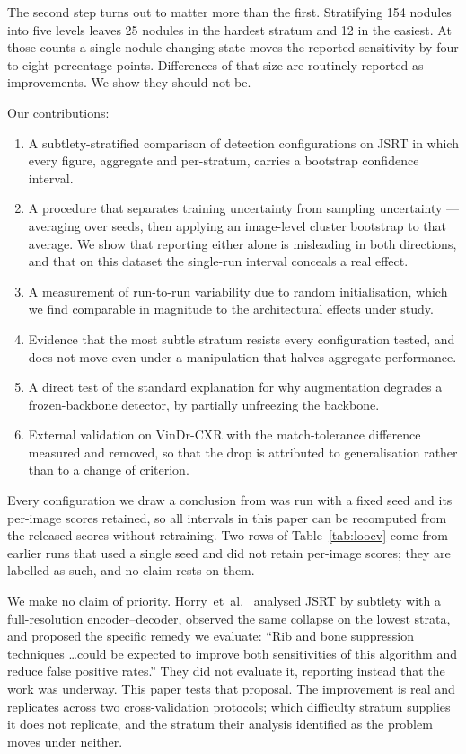 \documentclass[11pt,a4paper]{article}
\begin{document}
The second step turns out to matter more than the first. Stratifying 154
nodules into five levels leaves 25 nodules in the hardest stratum and 12 in the
easiest. At those counts a single nodule changing state moves the reported
sensitivity by four to eight percentage points. Differences of that size are
routinely reported as improvements. We show they should not be.

Our contributions:

\begin{enumerate}
  \item A subtlety-stratified comparison of detection configurations on JSRT in
        which every figure, aggregate and per-stratum, carries a bootstrap
        confidence interval.
  \item A procedure that separates training uncertainty from sampling
        uncertainty --- averaging over seeds, then applying an image-level
        cluster bootstrap to that average. We show that reporting either alone
        is misleading in both directions, and that on this dataset the
        single-run interval conceals a real effect.
  \item A measurement of run-to-run variability due to random initialisation,
        which we find comparable in magnitude to the architectural effects
        under study.
  \item Evidence that the most subtle stratum resists every configuration
        tested, and does not move even under a manipulation that halves
        aggregate performance.
  \item A direct test of the standard explanation for why augmentation degrades
        a frozen-backbone detector, by partially unfreezing the backbone.
  \item External validation on VinDr-CXR with the match-tolerance difference
        measured and removed, so that the drop is attributed to generalisation
        rather than to a change of criterion.
\end{enumerate}

Every configuration we draw a conclusion from was run with a fixed seed and
its per-image scores retained, so all intervals in this paper can be recomputed
from the released scores without retraining. Two rows of Table~\ref{tab:loocv} come from earlier runs that used a single
seed and did not retain per-image scores; they are labelled as such, and no claim
rests on them.

We make no claim of priority. Horry~et~al.~\cite{horry2023fullres} analysed
JSRT by subtlety with a full-resolution encoder--decoder, observed the same
collapse on the lowest strata, and proposed the specific remedy we evaluate:
``Rib and bone suppression techniques \ldots could be expected to improve both
sensitivities of this algorithm and reduce false positive rates.'' They did not
evaluate it, reporting instead that the work was underway. This paper tests that
proposal. The improvement is real and replicates across two cross-validation
protocols; which difficulty stratum supplies it does not replicate, and the
stratum their analysis identified as the problem moves under neither.
\end{document}
